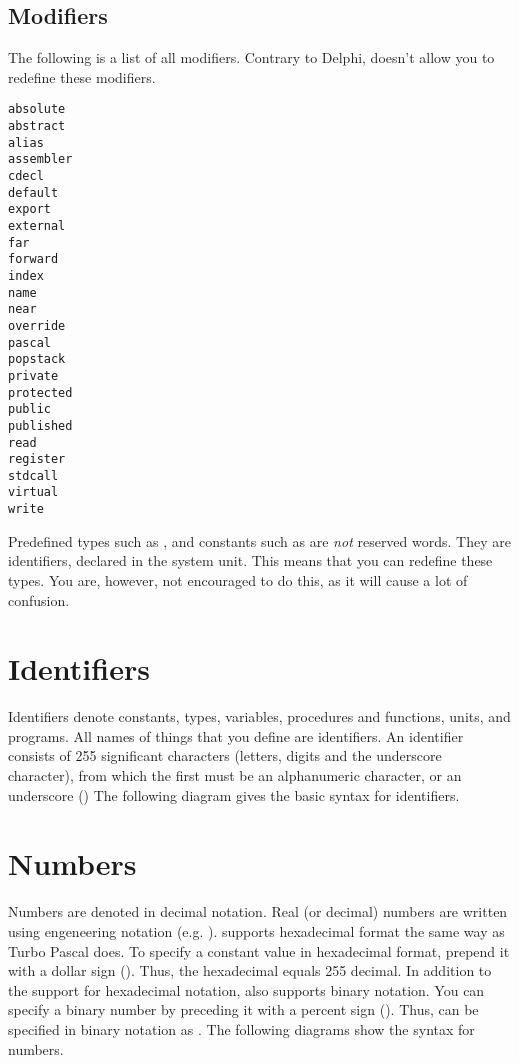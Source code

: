 \documentclass{report}
\begin{document}
\subsection{Modifiers}
The following is a list of all modifiers. Contrary to Delphi, \fpc doesn't
allow you to redefine these modifiers.
\begin{multicols}{4}
\begin{verbatim}
absolute
abstract
alias
assembler
cdecl
default
export
external
far
forward
index
name
near
override
pascal
popstack
private
protected
public
published
read
register
stdcall
virtual
write
\end{verbatim}
\end{multicols}
\begin{remark}
Predefined types such as ,  and constants
such as  are {\em not} reserved words. They are
identifiers, declared in the system unit. This means that you can redefine
these types. You are, however, not encouraged to do this, as it will cause
a lot of confusion.
\end{remark}

\section{Identifiers}
Identifiers denote constants, types, variables, procedures and functions,
units, and programs. All names of things that you define are identifiers.
An identifier consists of 255 significant characters (letters, digits and
the underscore character), from which the first must be an alphanumeric
character, or an underscore (\var{\_})
The following diagram gives the basic syntax for identifiers.


\section{Numbers}
Numbers are denoted in decimal notation. Real (or decimal) numbers are
written using engeneering notation (e.g. ).
\fpc supports hexadecimal format the same way as Turbo Pascal does. To
specify a constant value in hexadecimal format, prepend it with a dollar
sign (\var{\$}). Thus, the hexadecimal  equals 255 decimal.
In addition to the support for hexadecimal notation, \fpc also supports
binary notation. You can specify a binary number by preceding it with a
percent sign (\var{\%}). Thus,  can be specified in binary notation
as .
The following diagrams show the syntax for numbers.

\end{document}
